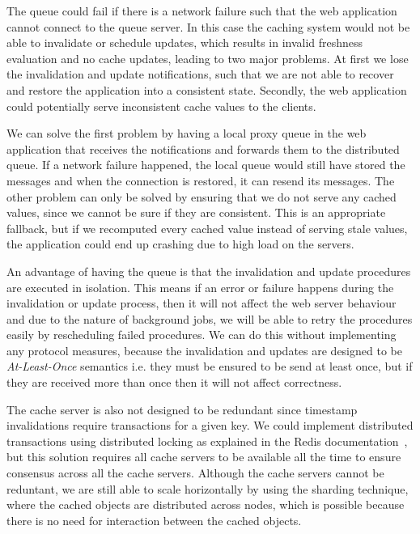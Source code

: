 The queue could fail if there is a network failure such that the web application cannot connect to the queue server. In this case the caching system would not be able to invalidate or schedule updates, which results in invalid freshness evaluation and no cache updates, leading to two major problems. At first we lose the invalidation and update notifications, such that we are not able to recover and restore the application into a consistent state. Secondly, the web application could potentially serve inconsistent cache values to the clients.

We can solve the first problem by having a local proxy queue in the web application that receives the notifications and forwards them to the distributed queue. If a network failure happened, the local queue would still have stored the messages and when the connection is restored, it can resend its messages. The other problem can only be solved by ensuring that we do not serve any cached values, since we cannot be sure if they are consistent. This is an appropriate fallback, but if we recomputed every cached value instead of serving stale values, the application could end up crashing due to high load on the servers.

An advantage of having the queue is that the invalidation and update procedures are executed in isolation. This means if an error or failure happens during the invalidation or update process, then it will not affect the web server behaviour and due to the nature of background jobs, we will be able to retry the procedures easily by rescheduling failed procedures. We can do this without implementing any protocol measures, because the invalidation and updates are designed to be \emph{At-Least-Once} semantics i.e. they must be ensured to be send at least once, but if they are received more than once then it will not affect correctness.

The cache server is also not designed to be redundant since timestamp invalidations require transactions for a given key. We could implement distributed transactions using distributed locking as explained in the Redis documentation~\cite{docs:redis-locking}, but this solution requires all cache servers to be available all the time to ensure consensus across all the cache servers. Although the cache servers cannot be reduntant, we are still able to scale horizontally by using the sharding technique, where the cached objects are distributed across nodes, which is possible because there is no need for interaction between the cached objects.


